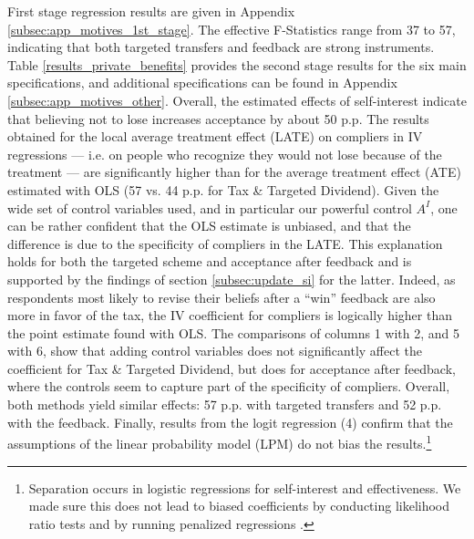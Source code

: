 \documentclass[12pt]{article} %
\begin{document}
First stage regression results are given in Appendix \ref{subsec:app_motives_1st_stage}. The effective F-Statistics \citep{montiel_pflueger_2013} range from 37 to 57, indicating that both targeted transfers and feedback are strong instruments. Table \ref{results_private_benefits} provides the second stage results for the six main specifications, and additional specifications can be found in Appendix \ref{subsec:app_motives_other}. Overall, the estimated effects of self-interest indicate that believing not to lose increases acceptance by about 50 p.p. The results obtained for the local average treatment effect (LATE) on compliers in IV regressions --- i.e. on people who recognize they would not lose because of the treatment --- are significantly higher than for the average treatment effect (ATE) estimated with OLS (57 vs. 44 p.p. for Tax \& Targeted Dividend). Given the wide set of control variables used, and in particular our powerful control $A^I$, one can be rather confident that the OLS estimate is unbiased, and that the difference is due to the specificity of compliers in the LATE. This explanation holds for both the targeted scheme and acceptance after feedback and is supported by the findings of section \ref{subsec:update_si} for the latter. Indeed, as respondents most likely to revise their beliefs after a ``win'' feedback are also more in favor of the tax, the IV coefficient for compliers is logically higher than the point estimate found with OLS. The comparisons of columns 1 with 2, and 5 with 6, show that adding control variables does not significantly affect the coefficient for Tax \& Targeted Dividend, but does for acceptance after feedback, where the controls seem to capture part of the specificity of compliers. Overall, both methods yield similar effects: 57 p.p. with targeted transfers and 52 p.p. with the feedback. Finally, results from the logit regression (4) confirm that the assumptions of the linear probability model (LPM) do not bias the results.\footnote{Separation occurs in logistic regressions for self-interest and effectiveness. We made sure this does not lead to biased coefficients by conducting likelihood ratio tests and by running penalized regressions \citep{firth_bias_1993,heinze_fixing_2003}. }
\end{document}
